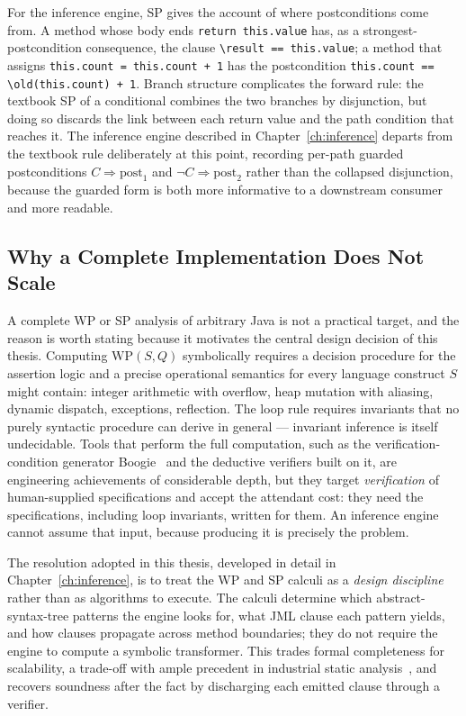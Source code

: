 For the inference engine, SP gives the account of where postconditions come
from. A method whose body ends \texttt{return this.value} has, as a
strongest-postcondition consequence, the clause
\texttt{\textbackslash result == this.value}; a method that assigns
\texttt{this.count = this.count + 1} has the postcondition
\texttt{this.count == \textbackslash old(this.count) + 1}. Branch structure
complicates the forward rule: the textbook SP of a conditional combines the
two branches by disjunction, but doing so discards the link between each
return value and the path condition that reaches it. The inference engine
described in Chapter~\ref{ch:inference} departs from the textbook rule
deliberately at this point, recording per-path guarded postconditions
$C \Rightarrow \mathrm{post}_1$ and $\neg C \Rightarrow \mathrm{post}_2$ rather
than the collapsed disjunction, because the guarded form is both more
informative to a downstream consumer and more readable.

\subsection{Why a Complete Implementation Does Not Scale}

A complete WP or SP analysis of arbitrary Java is not a practical target, and
the reason is worth stating because it motivates the central design decision
of this thesis. Computing $\mathrm{WP}(S, Q)$ symbolically requires a decision
procedure for the assertion logic and a precise operational semantics for
every language construct $S$ might contain: integer arithmetic with overflow,
heap mutation with aliasing, dynamic dispatch, exceptions, reflection. The
loop rule requires invariants that no purely syntactic procedure can derive in
general --- invariant inference is itself undecidable. Tools that perform the
full computation, such as the verification-condition generator
Boogie~\cite{barnett2005weakest} and the deductive verifiers built on it, are
engineering achievements of considerable depth, but they target
\emph{verification} of human-supplied specifications and accept the
attendant cost: they need the specifications, including loop invariants,
written for them. An inference engine cannot assume that input, because
producing it is precisely the problem.

The resolution adopted in this thesis, developed in detail in
Chapter~\ref{ch:inference}, is to treat the WP and SP calculi as a
\emph{design discipline} rather than as algorithms to execute. The calculi
determine which abstract-syntax-tree patterns the engine looks for, what JML
clause each pattern yields, and how clauses propagate across method
boundaries; they do not require the engine to compute a symbolic
transformer. This trades formal completeness for scalability, a trade-off with
ample precedent in industrial static analysis~\cite{calcagno2015infer}, and
recovers soundness after the fact by discharging each emitted clause through a
verifier.


